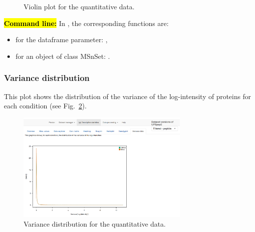 \documentclass[12pt]{article}
\begin{document}
\begin {figure}
\centering
{}
\caption{Violin plot for the quantitative data.}\label{fig:violinplot}
\end {figure}



\hl{\bf Command line:} In , the corresponding functions are:
\begin{itemize}
\item for the dataframe parameter: ,
\item for an object of class MSnSet: .
\end{itemize}




\subsubsection{Variance distribution}
This plot shows the distribution of the variance of the log-intensity of 
proteins for each condition (see Fig.~\ref{fig:sdvd}).

\begin {figure}
\centering
\includegraphics[width=0.75\textwidth]{images/desc_varDist.png}
\caption{Variance distribution for the quantitative data.}\label{fig:sdvd}
\end {figure}
\end{document}
